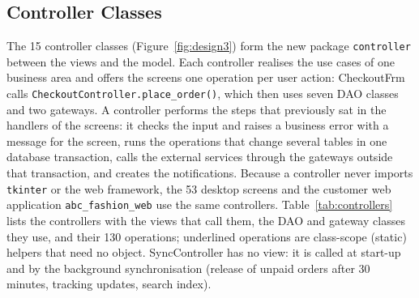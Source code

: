 \subsection{Controller Classes}
\label{subsec:controllers}
The 15 controller classes (Figure~\ref{fig:design3}) form the new package \texttt{controller} between the views and the model. Each controller realises the use cases of one business area and offers the screens one operation per user action: \textsf{CheckoutFrm} calls \texttt{CheckoutController.place\_order()}, which then uses seven DAO classes and two gateways. A controller performs the steps that previously sat in the handlers of the screens: it checks the input and raises a business error with a message for the screen, runs the operations that change several tables in one database transaction, calls the external services through the gateways outside that transaction, and creates the notifications. Because a controller never imports \texttt{tkinter} or the web framework, the 53 desktop screens and the customer web application \texttt{abc\_fashion\_web} use the same controllers. Table~\ref{tab:controllers} lists the controllers with the views that call them, the DAO and gateway classes they use, and their 130 operations; underlined operations are class-scope (static) helpers that need no object. \textsf{SyncController} has no view: it is called at start-up and by the background synchronisation (release of unpaid orders after 30 minutes, tracking updates, search index).

